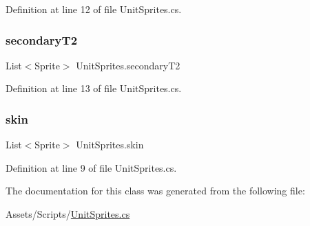 Definition at line 12 of file Unit\+Sprites.\+cs.

\mbox{\label{class_unit_sprites_afce363dd582be88b65df9b081a932400}} 
\subsubsection{\texorpdfstring{secondaryT2}{secondaryT2}}
{\footnotesize\ttfamily List$<$Sprite$>$ Unit\+Sprites.\+secondary\+T2}



Definition at line 13 of file Unit\+Sprites.\+cs.

\mbox{\label{class_unit_sprites_a0fb8aecfe21f48454c0ff88e3e62b46b}} 
\subsubsection{\texorpdfstring{skin}{skin}}
{\footnotesize\ttfamily List$<$Sprite$>$ Unit\+Sprites.\+skin}



Definition at line 9 of file Unit\+Sprites.\+cs.



The documentation for this class was generated from the following file\+:\begin{DoxyCompactItemize}
\item 
Assets/\+Scripts/\mbox{\hyperlink{_unit_sprites_8cs}{Unit\+Sprites.\+cs}}\end{DoxyCompactItemize}
